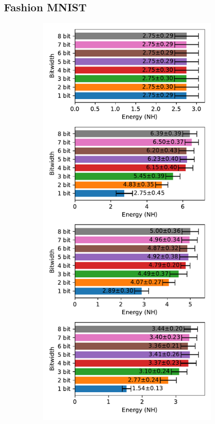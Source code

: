     \subsection{Fashion MNIST}
    \label{appendix:energy_neuromorphic_fashion_mnist}

        \begin{figure}[H]
            \centering
            \begin{subfigure}[H]{0.495\textwidth}
                \includegraphics[width=\textwidth]{../standard/FashionMNIST/plots/fashionmnist_test_energy_nh.pdf}

\end{subfigure}
\end{figure}
